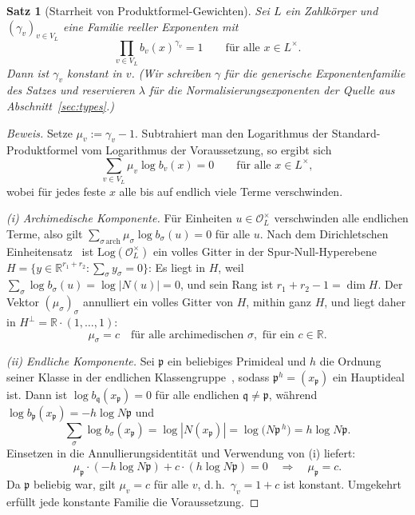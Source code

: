 \documentclass[11pt,a4paper]{article}
\newtheorem{theorem}{Satz}[section]
\theoremstyle{definition}
\theoremstyle{remark}
\newcommand{\OL}{\mathcal{O}_L}
\begin{document}
\begin{theorem}[Starrheit von Produktformel-Gewichten]\label{thm:rigidity}
Sei $L$ ein Zahlkörper und $(\gamma_v)_{v \in V_L}$ eine Familie reeller
Exponenten mit
\[
\prod_{v \in V_L} b_v(x)^{\gamma_v} = 1
\qquad \text{für alle } x \in L^\times .
\]
Dann ist $\gamma_v$ konstant in $v$. (Wir schreiben $\gamma$ für die
generische Exponentenfamilie des Satzes und reservieren $\lambda$ für die
Normalisierungsexponenten der Quelle aus Abschnitt~\ref{sec:types}.)
\end{theorem}

\begin{proof}[Beweis]
Setze $\mu_v := \gamma_v - 1$. Subtrahiert man den Logarithmus der
Standard-Produktformel vom Logarithmus der Voraussetzung, so ergibt sich
\[
\sum_{v \in V_L} \mu_v \log b_v(x) = 0
\qquad \text{für alle } x \in L^\times,
\]
wobei für jedes feste $x$ alle bis auf endlich viele Terme verschwinden.

\emph{(i) Archimedische Komponente.} Für Einheiten $u \in \OL^\times$
verschwinden alle endlichen Terme, also gilt
$\sum_{\sigma\,\mathrm{arch}} \mu_\sigma \log b_\sigma(u) = 0$ für alle $u$.
Nach dem Dirichletschen Einheitensatz~\cite[Ch.~I, \S7]{neukirch} ist
$\mathrm{Log}(\OL^\times)$ ein volles Gitter in der Spur-Null-Hyperebene
$H = \{ y \in \mathbb{R}^{r_1 + r_2} : \sum_\sigma y_\sigma = 0 \}$: Es liegt
in $H$, weil $\sum_\sigma \log b_\sigma(u) = \log|N(u)| = 0$, und sein Rang
ist $r_1 + r_2 - 1 = \dim H$. Der Vektor $(\mu_\sigma)_\sigma$ annulliert ein
volles Gitter von $H$, mithin ganz $H$, und liegt daher in
$H^\perp = \mathbb{R}\cdot(1,\dots,1)$:
\[
\mu_\sigma = c \quad \text{für alle archimedischen } \sigma,
\text{ für ein } c \in \mathbb{R}.
\]

\emph{(ii) Endliche Komponente.} Sei $\mathfrak{p}$ ein beliebiges Primideal
und $h$ die Ordnung seiner Klasse in der endlichen Klassengruppe~\cite[Ch.~I, \S6]{neukirch}, sodass $\mathfrak{p}^h = (x_{\mathfrak{p}})$ ein
Hauptideal ist. Dann ist $\log b_{\mathfrak{q}}(x_{\mathfrak{p}}) = 0$ für
alle endlichen $\mathfrak{q} \ne \mathfrak{p}$, während
$\log b_{\mathfrak{p}}(x_{\mathfrak{p}}) = -h \log N\mathfrak{p}$ und
\[
\sum_{\sigma} \log b_\sigma(x_{\mathfrak{p}})
= \log|N(x_{\mathfrak{p}})| = \log\bigl(N\mathfrak{p}^{\,h}\bigr)
= h \log N\mathfrak{p} .
\]
Einsetzen in die Annullierungsidentität und Verwendung von (i) liefert:
\[
\mu_{\mathfrak{p}} \cdot (-h \log N\mathfrak{p})
+ c \cdot (h \log N\mathfrak{p}) = 0
\quad\Longrightarrow\quad
\mu_{\mathfrak{p}} = c .
\]
Da $\mathfrak{p}$ beliebig war, gilt $\mu_v = c$ für alle $v$, d.\,h.\
$\gamma_v = 1 + c$ ist konstant. Umgekehrt erfüllt jede konstante Familie die
Voraussetzung.
\end{proof}
\end{document}

